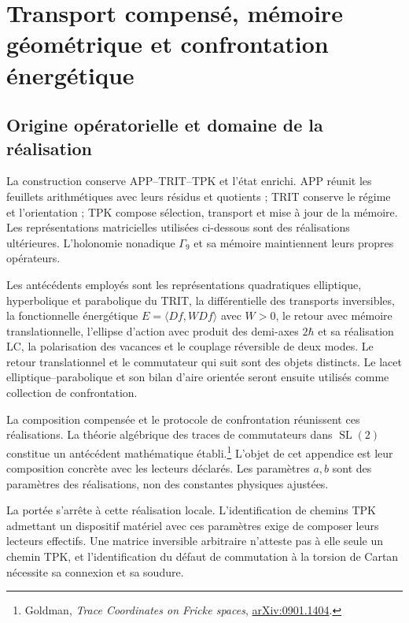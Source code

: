 \section{Transport compensé, mémoire géométrique et confrontation énergétique}
\label{md:aux:transporte}

\subsection{Origine opératorielle et domaine de la réalisation}
\label{md:aux:origen}

La construction conserve APP--TRIT--TPK et l’état enrichi. APP
réunit les feuillets arithmétiques avec leurs résidus et quotients ; TRIT conserve
le régime et l’orientation ; TPK compose sélection, transport et
mise à jour de la mémoire. Les représentations matricielles utilisées
ci-dessous sont des réalisations ultérieures. L’holonomie nonadique
$\Gamma_9$ et sa mémoire maintiennent leurs propres opérateurs.

Les antécédents employés sont les représentations quadratiques
elliptique, hyperbolique et parabolique du TRIT, la différentielle des
transports inversibles, la fonctionnelle énergétique
$E=\langle Df,WDf\rangle$ avec $W>0$, le retour avec mémoire
translationnelle, l’ellipse d’action avec produit des demi-axes $2\hbar$
et sa réalisation LC, la polarisation des vacances et le couplage
réversible de deux modes. Le retour translationnel et le commutateur
qui suit sont des objets distincts. Le lacet elliptique--parabolique et
son bilan d’aire orientée seront ensuite utilisés comme collection
de confrontation.

La composition compensée et le protocole de confrontation réunissent ces
réalisations. La théorie algébrique des traces de commutateurs dans
$\operatorname{SL}(2)$ constitue un antécédent mathématique
établi.\footnote{Goldman, \emph{Trace Coordinates on
Fricke spaces}, \href{https://arxiv.org/abs/0901.1404}{arXiv:0901.1404}.}
L’objet de cet appendice est leur composition concrète avec les
lecteurs déclarés. Les paramètres $a,b$ sont des paramètres des
réalisations, non des constantes physiques ajustées.

La portée s’arrête à cette réalisation locale. L’identification de
chemins TPK admettant un dispositif matériel avec ces paramètres
exige de composer leurs lecteurs effectifs. Une matrice inversible
arbitraire n’atteste pas à elle seule un chemin TPK, et l’identification
du défaut de commutation à la torsion de Cartan nécessite sa
connexion et sa soudure.

